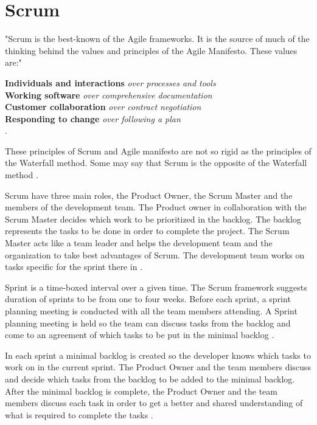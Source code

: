 \documentclass[UKenglish]{ifimaster}  %
\begin{document}
\section {Scrum}
\label{sec:Scrum}
"Scrum is the best-known of the Agile frameworks. It is the source of much of the thinking behind the values and principles of the Agile Manifesto. These values are:"  

\begin{center}
\textbf{Individuals and interactions}  \textit{over processes and tools} \\
\textbf{Working software} \textit{over comprehensive documentation} \\
\textbf{Customer collaboration} \textit{over contract negotiation} \\
\textbf{Responding to change} \textit{over following a plan} \\
\parencite{Scrum}.
\end{center}

These principles of Scrum and Agile manifesto are not so rigid as the principles of the Waterfall method. Some may say that Scrum is the opposite of the Waterfall method \parencite{cocco2011simulating}. 

Scrum have three main roles, the Product Owner, the Scrum Master and the members of the development team. The Product owner in collaboration with the Scrum Master decides which work to be prioritized in the backlog. The backlog represents the tasks to be done in order to complete the project. The Scrum Master acts like a team leader and helps the development team and the organization to take best advantages of Scrum. The development team works on tasks specific for the sprint there in \parencite{Scrum}.

Sprint is a time-boxed interval over a given time. The Scrum framework suggests duration of sprints to be from one to four weeks. Before each sprint, a sprint planning meeting is conducted with all the team members attending.  A Sprint planning meeting is held so the team can discuss tasks from the backlog and come to an agreement of which tasks to be put in the minimal backlog \parencite{Scrum}.

In each sprint a minimal backlog is created so the developer knows which tasks to work on in the current sprint. The Product Owner and the team members discuss and decide which tasks from the backlog to be added to the minimal backlog. After the minimal backlog is complete, the Product Owner and the team members discuss each task in order to get a better and shared understanding of what is required to complete the tasks \parencite{Scrum}. 
\end{document}
